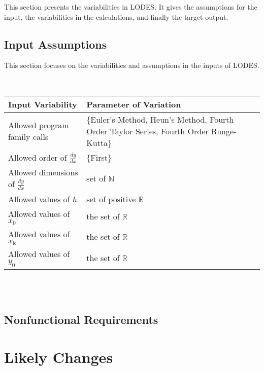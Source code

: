 \documentclass[12pt]{article}
\newcommand{\progname}{LODES} %
\begin{document}
This section presents the variabilities in \progname{}. It gives the assumptions for the input,
the variabilities in the calculations, and finally the target output.

\subsection{Input Assumptions} \label{Sec_ia}

This section focuses on the variabilities and assumptions in the inputs of \progname{}.

~\newline

\noindent
\begin{minipage}{\textwidth}
\renewcommand*{\arraystretch}{1.5}
\begin{tabular}{|p{}| p{}|}
  \hline
  \rowcolor[gray]{0.9}
  Input Variability& Parameter of Variation\\
  \hline
  Allowed program family calls& 
  \{Euler's Method, Heun's Method, Fourth Order Taylor Series, Fourth Order Runge-Kutta\}\\
  \hline
  Allowed order of $\frac{dy}{dx}$& \{First\} \\
  \hline
  Allowed dimensions of $\frac{dy}{dx}$ & set of $\mathbb{N}$\\ 
  \hline
  Allowed values of $h$ & set of positive $\mathbb{R}$\\
  \hline
  Allowed values of $x_\text{0}$ & the set of $\mathbb{R}$\\
  \hline
  Allowed values of $x_\text{k}$ & the set of $\mathbb{R}$\\
  \hline
  Allowed values of $y_\text{0}$ & the set of $\mathbb{R}$\\
  \hline

\end{tabular}
\end{minipage}\\

~\newline




\subsection{Nonfunctional Requirements}


\section{Likely Changes}    
\end{document}
